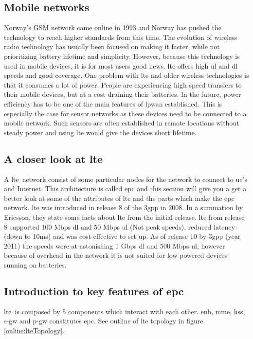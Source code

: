 \documentclass[USenglish]{ifimaster}  %
\begin{document}
\subsection{Mobile networks}
Norway's GSM network came online in 1993 \cite{online:gsmTelenorNetcom} and Norway has pushed the technology to reach higher standards from this time. The evolution of wireless radio technology has usually been focused on making it faster, while not prioritizing battery lifetime and simplicity. However, because this technology is used in mobile devices, it is for most users good news. \acrshort{lte} offers high \acrfull{ul} and \acrfull{dl} speeds and good coverage. One problem with \acrshort{lte} and older wireless technologies is that it consumes a lot of power. People are experiencing high speed transfers to their mobile devices, but at a cost draining their batteries. In the future, power efficiency has to be one of the main features of \acrshort{lpwan} established. This is especially the case for sensor networks as these devices need to be connected to a mobile network. Such sensors are often established in remote locations without steady power and using \acrshort{lte} would give the devices short lifetime.

\subsection{A closer look at \acrshort{lte}} \label{ssection:lte}
A \acrshort{lte} network consist of some particular nodes for the network to connect to \acrshort{ue}'s and Internet. This architecture is called \acrfull{epc} \cite{online:epc} and this section will give you a get a better look at some of the attributes of \acrshort{lte} and the parts which make the \acrshort{epc} network. \acrshort{lte} was introduced in release 8 of the \acrshort{3gpp} in 2008. In a summation by Ericsson, they state some facts about \acrshort{lte} from the initial release. \acrshort{lte} from release 8 supported 100 Mbps \acrshort{dl} and 50 Mbps \acrshort{ul} (Not peak speeds), reduced latency (down to 10ms) and was cost-effective to set up\cite{online:lteIntroduction}. As of release 10 by \acrshort{3gpp} (year 2011) the speeds were at astonishing 1 Gbps \acrshort{dl} and 500 Mbps \acrshort{ul}, however because of overhead in the network it is not suited for low powered devices running on batteries.

\subsection{Introduction to key features of \acrlong{epc}}
\acrshort{lte} is composed by 5 components which interact with each other. \acrshort{enb}, \acrshort{mme}, \acrshort{hss}, \acrshort{s-gw} and \acrshort{p-gw} constitutes \acrshort{epc}. See outline of \acrshort{lte} topology in figure \vref{online:lteTopology}.
\end{document}
